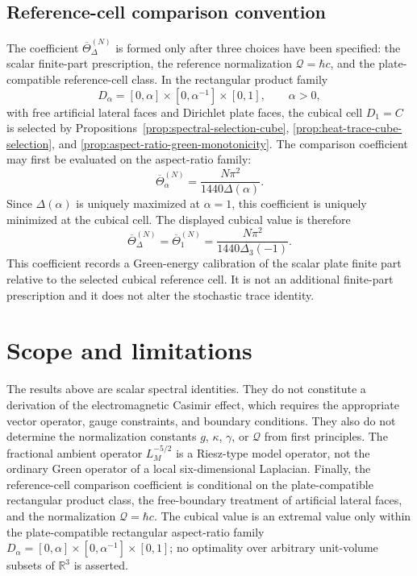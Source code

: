 \documentclass[11pt]{article}
\newcommand{\R}{\mathbb{R}}
\begin{document}
\subsection{Reference-cell comparison convention}

The coefficient \(\overline{\Theta}_{\Delta}^{(N)}\) is formed only after
three choices have been specified: the scalar finite-part prescription, the
reference normalization \(\mathcal Q=\hbar c\), and the plate-compatible
reference-cell class.  In the rectangular product family
\[
    D_\alpha=[0,\alpha]\times[0,\alpha^{-1}]\times[0,1],
    \qquad
    \alpha>0,
\]
with free artificial lateral faces and Dirichlet plate faces, the cubical
cell \(D_1=C\) is selected by
Propositions~\ref{prop:spectral-selection-cube},
\ref{prop:heat-trace-cube-selection}, and
\ref{prop:aspect-ratio-green-monotonicity}.  The comparison coefficient may
first be evaluated on the aspect-ratio family:
\[
    \overline{\Theta}_{\alpha}^{(N)}
    =
    \frac{N\pi^2}{1440\Delta(\alpha)}.
\]
Since \(\Delta(\alpha)\) is uniquely maximized at \(\alpha=1\), this
coefficient is uniquely minimized at the cubical cell.  The displayed
cubical value is therefore
\[
    \overline{\Theta}_{\Delta}^{(N)}
    =
    \overline{\Theta}_{1}^{(N)}
    =
    \frac{N\pi^2}{1440\Delta_3(-1)}.
\]
This coefficient records a Green-energy calibration of the scalar plate
finite part relative to the selected cubical reference cell.  It is not an
additional finite-part prescription and it does not alter the stochastic
trace identity.


\section{Scope and limitations}
\label{sec:scope-limitations}

The results above are scalar spectral identities.  They do not constitute a derivation of the electromagnetic Casimir effect, which requires the appropriate vector operator, gauge constraints, and boundary conditions.  They also do not determine the normalization constants $g$, $\kappa$, $\gamma$, or $\mathcal Q$ from first principles.  The fractional ambient operator $L_M^{-5/2}$ is a Riesz-type model operator, not the ordinary Green operator of a local six-dimensional Laplacian.  Finally, the reference-cell comparison coefficient is conditional on the plate-compatible rectangular product class, the free-boundary treatment of artificial lateral faces, and the normalization $\mathcal Q=\hbar c$.  The cubical value is an extremal value only within the plate-compatible rectangular aspect-ratio family $D_\alpha=[0,\alpha]\times[0,\alpha^{-1}]\times[0,1]$; no optimality over arbitrary unit-volume subsets of $\R^3$ is asserted.
\end{document}
